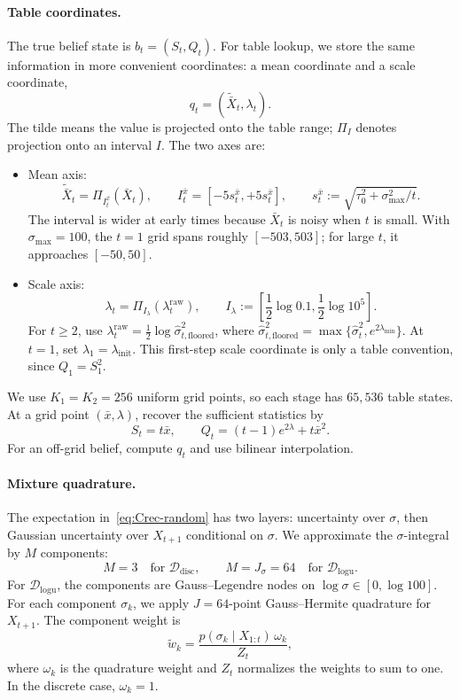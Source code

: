 \documentclass[11pt]{article}
\begin{document}
\paragraph{Table coordinates.}\label{app:adp-random-grids}
The true belief state is \(b_t=(S_t,Q_t)\). For table lookup, we store the same information in more convenient coordinates: a mean coordinate and a scale coordinate,
\[
q_t=(\widetilde{\bar X}_t,\lambda_t).
\]
The tilde means the value is projected onto the table range; \(\Pi_I\) denotes projection onto an interval \(I\). The two axes are:
\begin{itemize}
\item Mean axis:
\[
\widetilde{\bar X}_t=\Pi_{I_t^{\bar x}}(\bar X_t),
\qquad
I_t^{\bar x}=[-5s_t^{\bar x},+5s_t^{\bar x}],
\qquad
s_t^{\bar x}:=\sqrt{\tau_0^2+\sigma_{\max}^2/t}.
\]
The interval is wider at early times because \(\bar X_t\) is noisy when \(t\) is small. With \(\sigma_{\max}=100\), the \(t=1\) grid spans roughly \([-503,503]\); for large \(t\), it approaches \([-50,50]\).
\item Scale axis:
\[
\lambda_t=\Pi_{I_\lambda}(\lambda_t^{\mathrm{raw}}),
\qquad
I_\lambda:=\left[\frac12\log 0.1,\frac12\log 10^5\right].
\]
For \(t\ge2\), use \(\lambda_t^{\mathrm{raw}}=\frac12\log\hat\sigma_{t,\mathrm{floored}}^2\), where \(\hat\sigma_{t,\mathrm{floored}}^2=\max\{\hat\sigma_t^2,e^{2\lambda_{\min}}\}\). At \(t=1\), set \(\lambda_1=\lambda_{\mathrm{init}}\). This first-step scale coordinate is only a table convention, since \(Q_1=S_1^2\).
\end{itemize}
We use \(K_1=K_2=256\) uniform grid points, so each stage has \(65{,}536\) table states. At a grid point \((\bar x,\lambda)\), recover the sufficient statistics by
\[
S_t=t\bar x,
\qquad
Q_t=(t-1)e^{2\lambda}+t\bar x^2 .
\]
For an off-grid belief, compute \(q_t\) and use bilinear interpolation.

\paragraph{Mixture quadrature.}
The expectation in~\eqref{eq:Crec-random} has two layers: uncertainty over \(\sigma\), then Gaussian uncertainty over \(X_{t+1}\) conditional on \(\sigma\). We approximate the \(\sigma\)-integral by \(M\) components:
\[
M=3 \quad\text{for }\mathcal{D}_{\mathrm{disc}},
\qquad
M=J_\sigma=64 \quad\text{for }\mathcal{D}_{\mathrm{logu}}.
\]
For \(\mathcal{D}_{\mathrm{logu}}\), the components are Gauss--Legendre nodes on \(\log\sigma\in[0,\log100]\). For each component \(\sigma_k\), we apply \(J=64\)-point Gauss--Hermite quadrature for \(X_{t+1}\). The component weight is
\[
\tilde w_k=\frac{p(\sigma_k\mid X_{1:t})\,\omega_k}{Z_t},
\]
where \(\omega_k\) is the quadrature weight and \(Z_t\) normalizes the weights to sum to one. In the discrete case, \(\omega_k=1\).
\end{document}
